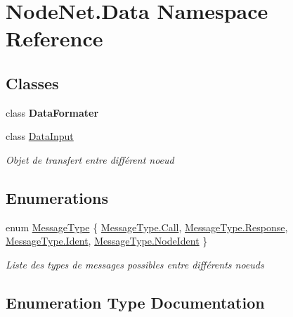 \hypertarget{namespace_node_net_1_1_data}{}\section{Node\+Net.\+Data Namespace Reference}
\label{namespace_node_net_1_1_data}
\subsection*{Classes}
\begin{DoxyCompactItemize}
\item 
class {\bfseries Data\+Formater}
\item 
class \hyperlink{class_node_net_1_1_data_1_1_data_input}{Data\+Input}
\begin{DoxyCompactList}\small\item\em Objet de transfert entre différent noeud \end{DoxyCompactList}\end{DoxyCompactItemize}
\subsection*{Enumerations}
\begin{DoxyCompactItemize}
\item 
enum \hyperlink{namespace_node_net_1_1_data_a85df1ebe14b4337a629267e033a1272d}{Message\+Type} \{ \hyperlink{namespace_node_net_1_1_data_a85df1ebe14b4337a629267e033a1272dac3755e61202abd74da5885d2e9c9160e}{Message\+Type.\+Call}, 
\hyperlink{namespace_node_net_1_1_data_a85df1ebe14b4337a629267e033a1272dad64ed3e9c10229648e069f56e32f4c8e}{Message\+Type.\+Response}, 
\hyperlink{namespace_node_net_1_1_data_a85df1ebe14b4337a629267e033a1272da35cef9b551d46ecfd244f4694de9e228}{Message\+Type.\+Ident}, 
\hyperlink{namespace_node_net_1_1_data_a85df1ebe14b4337a629267e033a1272da66085f83a195ed8456fe8a05feffc9bc}{Message\+Type.\+Node\+Ident}
 \}\begin{DoxyCompactList}\small\item\em Liste des types de messages possibles entre différents noeuds \end{DoxyCompactList}
\end{DoxyCompactItemize}


\subsection{Enumeration Type Documentation}
\mbox{\label{namespace_node_net_1_1_data_a85df1ebe14b4337a629267e033a1272d}} 
